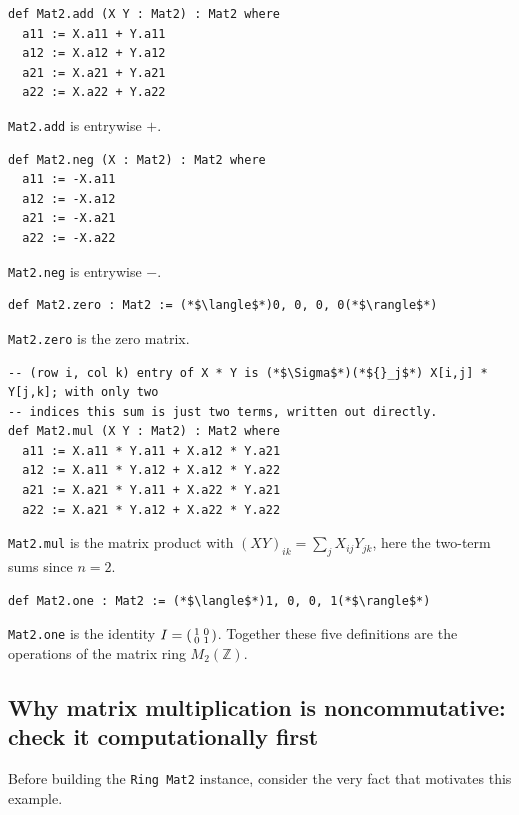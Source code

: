\begin{lstlisting}
def Mat2.add (X Y : Mat2) : Mat2 where
  a11 := X.a11 + Y.a11
  a12 := X.a12 + Y.a12
  a21 := X.a21 + Y.a21
  a22 := X.a22 + Y.a22
\end{lstlisting}

\texttt{Mat2.add} is entrywise \(+\).

\begin{lstlisting}
def Mat2.neg (X : Mat2) : Mat2 where
  a11 := -X.a11
  a12 := -X.a12
  a21 := -X.a21
  a22 := -X.a22
\end{lstlisting}

\texttt{Mat2.neg} is entrywise \(-\).

\begin{lstlisting}
def Mat2.zero : Mat2 := (*$\langle$*)0, 0, 0, 0(*$\rangle$*)
\end{lstlisting}

\texttt{Mat2.zero} is the zero matrix.

\begin{lstlisting}
-- (row i, col k) entry of X * Y is (*$\Sigma$*)(*${}_j$*) X[i,j] * Y[j,k]; with only two
-- indices this sum is just two terms, written out directly.
def Mat2.mul (X Y : Mat2) : Mat2 where
  a11 := X.a11 * Y.a11 + X.a12 * Y.a21
  a12 := X.a11 * Y.a12 + X.a12 * Y.a22
  a21 := X.a21 * Y.a11 + X.a22 * Y.a21
  a22 := X.a21 * Y.a12 + X.a22 * Y.a22
\end{lstlisting}

\texttt{Mat2.mul} is the matrix product with \((XY)_{ik} = \sum_j X_{ij}Y_{jk}\), here the two-term sums since \(n = 2\).

\begin{lstlisting}
def Mat2.one : Mat2 := (*$\langle$*)1, 0, 0, 1(*$\rangle$*)
\end{lstlisting}

\texttt{Mat2.one} is the identity \(I = \begin{psmallmatrix}1&0\\0&1\end{psmallmatrix}\). Together these five definitions are the operations of the matrix ring \(M_2(\mathbb{Z})\).

\subsection{Why matrix multiplication is noncommutative: check it computationally first}\label{sec:08-rings:07-matrices:2}

Before building the \texttt{Ring Mat2} instance, consider the very fact that motivates this example.

